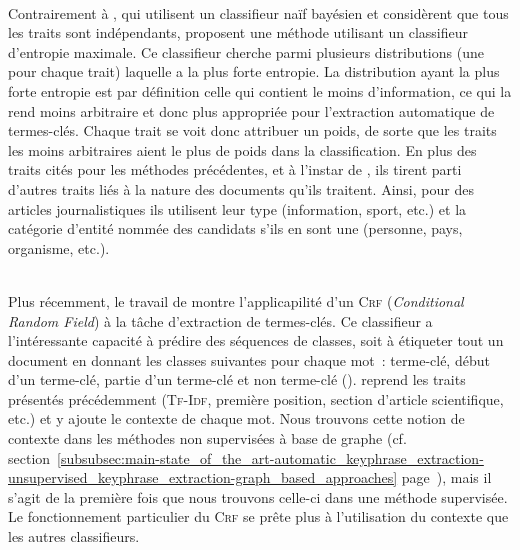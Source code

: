         ~\\Contrairement à , qui utilisent un classifieur
        naïf bayésien et considèrent que tous les traits sont indépendants,
         proposent une méthode utilisant un
        classifieur d'entropie maximale. Ce classifieur cherche parmi plusieurs
        distributions (une pour chaque trait) laquelle a la plus forte entropie.
        La distribution ayant la plus forte entropie est par définition celle
        qui contient le moins d'information, ce qui la rend moins arbitraire et
        donc plus appropriée pour l'extraction automatique de termes-clés.
        Chaque trait se voit donc attribuer un poids, de sorte que les traits
        les moins arbitraires aient le plus de poids dans la classification. En
        plus des traits cités pour les méthodes précédentes, et à l'instar de
        , ils tirent parti d'autres
        traits liés à la nature des documents qu'ils traitent. Ainsi, pour des
        articles journalistiques ils utilisent leur type (information, sport,
        etc.) et la catégorie d'entité nommée des candidats s'ils en sont une
        (personne, pays, organisme, etc.).

        ~\\Plus récemment, le travail de 
        montre l'applicapilité d'un \textsc{Crf} (\textit{Conditional Random
        Field}) à la tâche d'extraction de termes-clés. Ce classifieur a
        l'intéressante capacité à prédire des séquences de classes, soit à
        étiqueter tout un document en donnant les classes suivantes pour chaque
        mot~: \og{}terme-clé\fg{}, \og{}début d'un terme-clé\fg{}, \og{}partie
        d'un terme-clé\fg{} et \og{}non terme-clé\fg{} (). 
        reprend les traits présentés précédemment (\textsc{Tf-Idf}, première position,
        section d'article scientifique, etc.) et y ajoute le contexte de
        chaque mot. Nous trouvons cette notion de contexte dans les méthodes non
        supervisées à base de graphe (cf.
        section~\ref{subsubsec:main-state_of_the_art-automatic_keyphrase_extraction-unsupervised_keyphrase_extraction-graph_based_approaches}
        page~\pageref{subsubsec:main-state_of_the_art-automatic_keyphrase_extraction-unsupervised_keyphrase_extraction-graph_based_approaches}),
        mais il s'agit de la première fois que nous trouvons celle-ci dans une
        méthode supervisée. Le fonctionnement particulier du \textsc{Crf} se
        prête plus à l'utilisation du contexte que les autres classifieurs.

